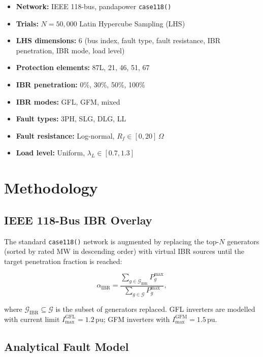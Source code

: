 \documentclass[11pt,a4paper]{article}
\newcommand{\pu}{\,\text{pu}}
\begin{document}
\begin{itemize}
  \item \textbf{Network:} IEEE 118-bus, pandapower \texttt{case118()}
  \item \textbf{Trials:} $N = 50{,}000$ Latin Hypercube Sampling (LHS)
  \item \textbf{LHS dimensions:} 6 (bus index, fault type, fault resistance,
        IBR penetration, IBR mode, load level)
  \item \textbf{Protection elements:} 87L, 21, 46, 51, 67
  \item \textbf{IBR penetration:} 0\%, 30\%, 50\%, 100\%
  \item \textbf{IBR modes:} GFL, GFM, mixed
  \item \textbf{Fault types:} 3PH, SLG, DLG, LL
  \item \textbf{Fault resistance:} Log-normal, $R_f \in [0, 20]\,\Omega$
  \item \textbf{Load level:} Uniform, $\lambda_L \in [0.7, 1.3]$
\end{itemize}

\section{Methodology}
\label{sec:method}

\subsection{IEEE 118-Bus IBR Overlay}

The standard \texttt{case118()} network is augmented by replacing the
top-$N$ generators (sorted by rated MW in descending order) with virtual
IBR sources until the target penetration fraction is reached:

\begin{equation}
  \alpha_{\text{IBR}} = \frac{\sum_{g \in \mathcal{G}_{\text{IBR}}} P_g^{\max}}
  {\sum_{g \in \mathcal{G}} P_g^{\max}},
  \label{eq:ibr_pen}
\end{equation}

where $\mathcal{G}_{\text{IBR}} \subseteq \mathcal{G}$ is the subset of
generators replaced.  GFL inverters are modelled with current limit
$I_{\max}^{\text{GFL}} = 1.2\pu$; GFM inverters with
$I_{\max}^{\text{GFM}} = 1.5\pu$.

\subsection{Analytical Fault Model}
\end{document}
